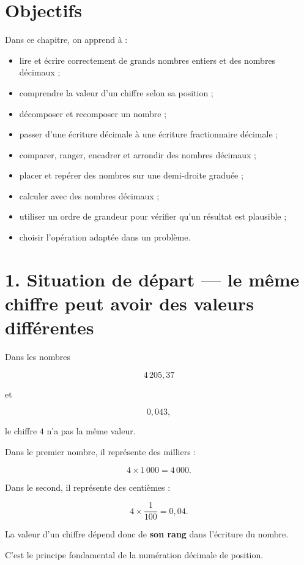 
\section{Objectifs}

Dans ce chapitre, on apprend à :

\begin{itemize}
\item lire et écrire correctement de grands nombres entiers et des nombres décimaux ;
\item comprendre la valeur d’un chiffre selon sa position ;
\item décomposer et recomposer un nombre ;
\item passer d’une écriture décimale à une écriture fractionnaire décimale ;
\item comparer, ranger, encadrer et arrondir des nombres décimaux ;
\item placer et repérer des nombres sur une demi-droite graduée ;
\item calculer avec des nombres décimaux ;
\item utiliser un ordre de grandeur pour vérifier qu’un résultat est plausible ;
\item choisir l’opération adaptée dans un problème.
\end{itemize}

\section{1. Situation de départ — le même chiffre peut avoir des valeurs différentes}

Dans les nombres

\[
4\,205{,}37
\]

et

\[
0{,}043,
\]

le chiffre $4$ n’a pas la même valeur.

Dans le premier nombre, il représente des milliers :

\[
4\times1\,000=4\,000.
\]

Dans le second, il représente des centièmes :

\[
4\times\dfrac{1}{100}=0{,}04.
\]

La valeur d’un chiffre dépend donc de \textbf{son rang} dans l’écriture du nombre.

C’est le principe fondamental de la numération décimale de position.

